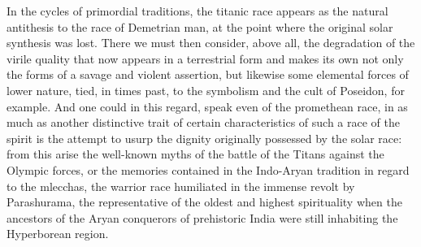 In the cycles of primordial traditions, the titanic race appears as the natural antithesis to the race of Demetrian man, at the point where the original solar synthesis was lost. There we must then consider, above all, the degradation of the virile quality that now appears in a terrestrial form and makes its own not only the forms of a savage and violent assertion, but likewise some elemental forces of lower nature, tied, in times past, to the symbolism and the cult of Poseidon, for example. And one could in this regard, speak even of the promethean race, in as much as another distinctive trait of certain characteristics of such a race of the spirit is the attempt to usurp the dignity originally possessed by the solar race: from this arise the well-known myths of the battle of the Titans against the Olympic forces, or the memories contained in the Indo-Aryan tradition in regard to the mlecchas, the warrior race humiliated in the immense revolt by Parashurama, the representative of the oldest and highest spirituality when the ancestors of the Aryan conquerors of prehistoric India were still inhabiting the Hyperborean region.




